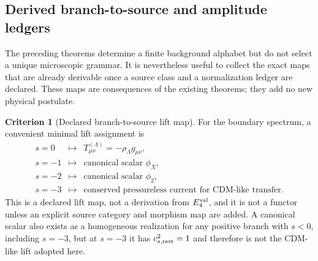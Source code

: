 \documentclass[11pt,a4paper]{article}
\numberwithin{equation}{section}
\theoremstyle{definition}
\newtheorem{criterion}{Criterion}
\theoremstyle{plain}
\theoremstyle{remark}
\newcommand{\Efour}{E_4}
\begin{document}
\subsection{Derived branch-to-source and amplitude ledgers}
\label{sec:derived-ledgers}

The preceding theorems determine a finite background alphabet but do not select
a unique microscopic grammar.  It is nevertheless useful to collect the exact
maps that are already derivable once a source class and a normalization ledger
are declared.  These maps are consequences of the existing theorems; they add
no new physical postulate.

\begin{criterion}[Declared branch-to-source lift map]
For the boundary spectrum, a convenient minimal lift assignment is
\begin{equation}
\boxed{
\begin{array}{ccl}
s=0   &\longmapsto& T_{\mu\nu}^{(\Lambda)}=-\rho_\Lambda g_{\mu\nu},\\[1mm]
s=-1  &\longmapsto& \text{canonical scalar }\phi_X,\\[1mm]
s=-2  &\longmapsto& \text{canonical scalar }\phi_2,\\[1mm]
s=-3  &\longmapsto& \text{conserved pressureless current for CDM-like transfer}.
\end{array}}
\end{equation}
This is a declared lift map, not a derivation from \(\Efour^{\rm val}\), and it
is not a functor unless an explicit source category and morphism map are added.
A canonical scalar also exists as a homogeneous realization for any positive
branch with \(s<0\), including \(s=-3\), but at \(s=-3\) it has
\(c_{s,{\rm rest}}^2=1\) and therefore is not the CDM-like lift adopted here.
\end{criterion}
\end{document}
